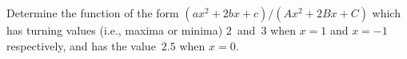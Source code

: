 Determine the function of the form $(ax^{2} + 2bx + c)/(Ax^{2} + 2Bx + C)$
which has turning values (i.e., maxima or minima) $2$~and~$3$ when $x = 1$ and
$x = -1$ respectively, and has the value~$2.5$ when $x = 0$. 

